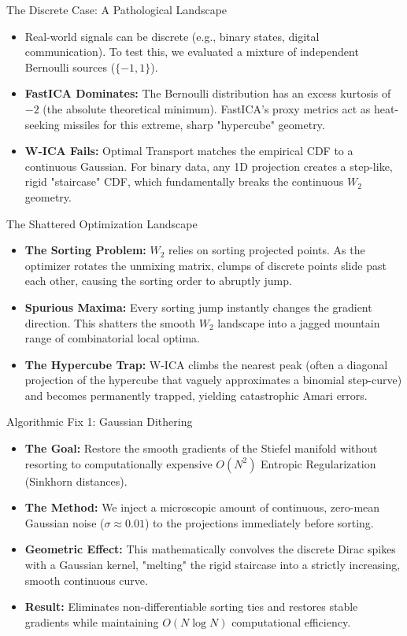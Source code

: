\documentclass{beamer}
\begin{document}
\begin{frame}{The Discrete Case: A Pathological Landscape}
  \begin{itemize}
    \item Real-world signals can be discrete (e.g., binary states, digital communication). To test this, we evaluated a mixture of independent Bernoulli sources ($\{-1, 1\}$).
    \item \textbf{FastICA Dominates:} The Bernoulli distribution has an excess kurtosis of $-2$ (the absolute theoretical minimum). FastICA's proxy metrics act as heat-seeking missiles for this extreme, sharp "hypercube" geometry.
    \item \textbf{W-ICA Fails:} Optimal Transport matches the empirical CDF to a continuous Gaussian. For binary data, any 1D projection creates a step-like, rigid "staircase" CDF, which fundamentally breaks the continuous $W_2$ geometry.
  \end{itemize}
\end{frame}

\begin{frame}{The Shattered Optimization Landscape}
  \begin{itemize}
    \item \textbf{The Sorting Problem:} $W_2$ relies on sorting projected points. As the optimizer rotates the unmixing matrix, clumps of discrete points slide past each other, causing the sorting order to abruptly jump.
    \item \textbf{Spurious Maxima:} Every sorting jump instantly changes the gradient direction. This shatters the smooth $W_2$ landscape into a jagged mountain range of combinatorial local optima.
    \item \textbf{The Hypercube Trap:} W-ICA climbs the nearest peak (often a diagonal projection of the hypercube that vaguely approximates a binomial step-curve) and becomes permanently trapped, yielding catastrophic Amari errors.
  \end{itemize}
\end{frame}

\begin{frame}{Algorithmic Fix 1: Gaussian Dithering}
  \begin{itemize}
    \item \textbf{The Goal:} Restore the smooth gradients of the Stiefel manifold without resorting to computationally expensive $O(N^2)$ Entropic Regularization (Sinkhorn distances).
    \item \textbf{The Method:} We inject a microscopic amount of continuous, zero-mean Gaussian noise ($\sigma \approx 0.01$) to the projections immediately before sorting.
    \item \textbf{Geometric Effect:} This mathematically convolves the discrete Dirac spikes with a Gaussian kernel, "melting" the rigid staircase into a strictly increasing, smooth continuous curve.
    \item \textbf{Result:} Eliminates non-differentiable sorting ties and restores stable gradients while maintaining $O(N \log N)$ computational efficiency.
  \end{itemize}
\end{frame}
\end{document}
